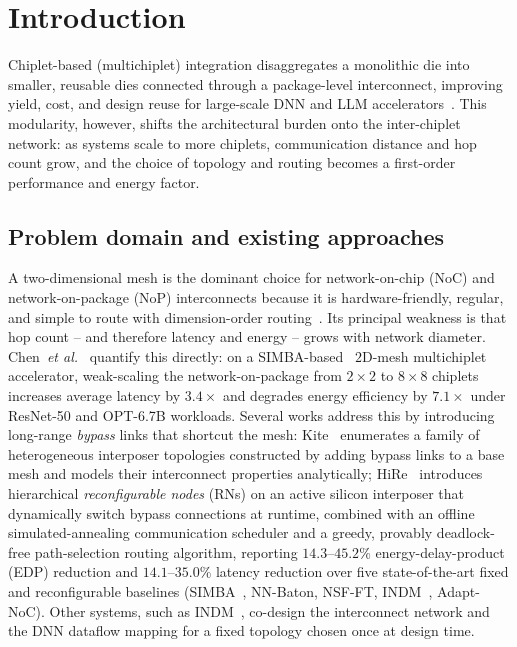\documentclass[conference]{IEEEtran}
\begin{document}
\section{Introduction}

Chiplet-based (multichiplet) integration disaggregates a monolithic die into smaller, reusable dies connected through a package-level interconnect, improving yield, cost, and design reuse for large-scale DNN and LLM accelerators~\cite{simba}. This modularity, however, shifts the architectural burden onto the inter-chiplet network: as systems scale to more chiplets, communication distance and hop count grow, and the choice of topology and routing becomes a first-order performance and energy factor.

\subsection{Problem domain and existing approaches}
A two-dimensional mesh is the dominant choice for network-on-chip (NoC) and network-on-package (NoP) interconnects because it is hardware-friendly, regular, and simple to route with dimension-order routing~\cite{hire}. Its principal weakness is that hop count -- and therefore latency and energy -- grows with network diameter. Chen~\emph{et al.}~\cite{hire} quantify this directly: on a SIMBA-based~\cite{simba} $2$D-mesh multichiplet accelerator, weak-scaling the network-on-package from $2\times2$ to $8\times8$ chiplets increases average latency by $3.4\times$ and degrades energy efficiency by $7.1\times$ under ResNet-50 and OPT-6.7B workloads. Several works address this by introducing long-range \emph{bypass} links that shortcut the mesh: Kite~\cite{kite} enumerates a family of heterogeneous interposer topologies constructed by adding bypass links to a base mesh and models their interconnect properties analytically; HiRe~\cite{hire} introduces hierarchical \emph{reconfigurable nodes} (RNs) on an active silicon interposer that dynamically switch bypass connections at runtime, combined with an offline simulated-annealing communication scheduler and a greedy, provably deadlock-free path-selection routing algorithm, reporting $14.3$--$45.2\%$ energy-delay-product (EDP) reduction and $14.1$--$35.0\%$ latency reduction over five state-of-the-art fixed and reconfigurable baselines (SIMBA~\cite{simba}, NN-Baton, NSF-FT, INDM~\cite{indm}, Adapt-NoC). Other systems, such as INDM~\cite{indm}, co-design the interconnect network and the DNN dataflow mapping for a fixed topology chosen once at design time.
\end{document}
